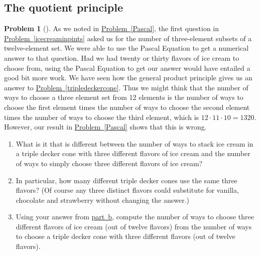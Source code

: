 \documentclass[10pt,]{book}
\theoremstyle{plain}
\theoremstyle{definition}
\newtheorem{activity}[project]{Problem}
\theoremstyle{definition}
\numberwithin{equation}{chapter}
\begin{document}
\subsection[{The quotient principle}]{The quotient principle}\label{subsection-6}
\begin{activity}[] \label{twelvechoosethree}
\hypertarget{p-201}{}%
As we noted in \hyperref[Pascal]{Problem~\ref{Pascal}}, the first question in \hyperref[icecreaminpints]{Problem~\ref{icecreaminpints}} asked us for the number of three-element subsets of a twelve-element set. We were able to use the Pascal Equation to get a numerical answer to that question. Had we had twenty or thirty flavors of ice cream to choose from, using the Pascal Equation to get our answer would have entailed a good bit more work. We have seen how the general product principle gives us an answer to \hyperref[tripledeckercone]{Problem~\ref{tripledeckercone}}. Thus we might think that the number of ways to choose a three element set from 12 elements is the number of ways to choose the first element times the number of ways to choose the second element times the number of ways to choose the third element, which is \(12\cdot11\cdot10=1320\). However, our result in \hyperref[Pascal]{Problem~\ref{Pascal}} shows that this is wrong.%
\begin{enumerate}[font=\bfseries,label=(\alph*),ref=\alph*]
\item\label{task-35} \marginsymbol[-2.5em]{} \hypertarget{p-202}{}%
What is it that is different between the number of ways to stack ice cream in a triple decker cone with three different flavors of ice cream and the number of ways to simply choose three different flavors of ice cream?%
\item\label{twelvechoosethreethree} \marginsymbol[-2.5em]{} \hypertarget{p-204}{}%
In particular, how many different triple decker cones use the same three flavors?  (Of course any three distinct flavors could substitute for vanilla, chocolate and strawberry without changing the answer.)%
\item\label{twelvechoosethreefinal} \marginsymbol[-2.5em]{} \hypertarget{p-206}{}%
Using your answer from \hyperref[twelvechoosethreethree]{part~b}, compute the number of ways to choose three different flavors of ice cream (out of twelve flavors) from the number of ways to choose a triple decker cone with three different flavors (out of twelve  flavors).%
\end{enumerate}
\end{activity}
\end{document}
